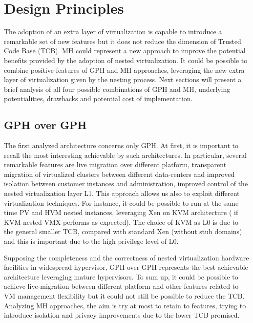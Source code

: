 \documentclass{acm_proc_article-sp} %
\begin{document}
\section{Design Principles}

The adoption of an extra layer of virtualization is capable to introduce a remarkable set of new features but it does not reduce the dimension of Trusted Code Base (TCB). 
MH could represent a new approach to improve the potential benefits provided by the adoption of nested virtualization.  It could be possible to combine positive features of GPH and MH approaches, leveraging the new extra layer of virtualization given by the nesting process.
Next sections will present a brief analysis of all four possible combinations of GPH and MH, underlying potentialities, drawbacks and potential cost of implementation.



\subsection{GPH over GPH}

The first analyzed architecture concerns only GPH. At first, it is important to recall the most interesting achievable by such architectures. In particular, several remarkable features are live migration over different platform, transparent migration of virtualized clusters between different data-centers and improved isolation between customer instances and administration, improved control of the nested virtualization layer L1.
This approach allows us also to exploit different virtualization techniques. For instance, it could be possible to run at the same time PV and HVM nested instances, leveraging  Xen on KVM architecture ( if KVM nested VMX performs as expected).
The choice of KVM as L0 is due to the general smaller TCB, compared with standard Xen (without stub domains) and this is important due to the high privilege level of L0.

Supposing the completeness and the correctness of nested virtualization hardware facilities in widespread hypervisor, GPH over GPH represents the best achievable architecture leveraging mature hypervisors. To sum up, it could be possible to achieve live-migration between different platform and other features related to VM management flexibility but it could not still be possible to reduce the TCB. Analyzing MH approaches, the aim is try at most to retain to features, trying to introduce isolation and privacy improvements due to the lower TCB promised.
\end{document}

